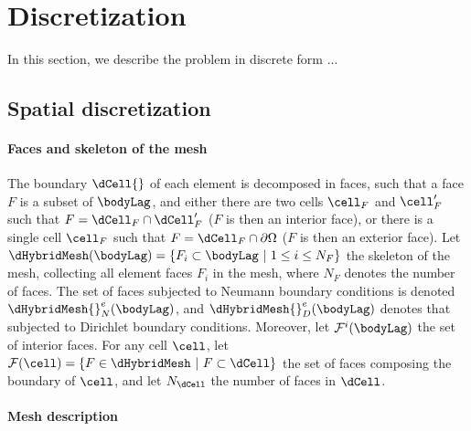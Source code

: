 %
%
\section{Discretization}
\label{sec-discretization}

In this section, we describe the problem in discrete form ...

\subsection{Spatial discretization}

\paragraph{Faces and skeleton of the mesh}

The boundary $\dCell{}$ of each element is decomposed in faces, such
that a face $F$ is a subset of $\bodyLag$, and either there are two
cells $\cell_F$ and $\cell_F'$ such that $F = \dCell_F \cap \dCell_F'$
($F$ is then an interior face), or there is a single cell $\cell_F$ such
that $F = \dCell_F \cap \partial \Omega$ ($F$ is then an exterior face).
Let $\dHybridMesh(\bodyLag) = \{ F_i \subset \bodyLag \ \vert \ 1 \leq i
\leq N_{F} \}$ the skeleton of the mesh, collecting all element faces
$F_i$ in the mesh, where $N_{F}$ denotes the number of faces. The set of
faces subjected to Neumann boundary conditions is denoted
$\dHybridMesh{}_{N}^e(\bodyLag)$, and $\dHybridMesh{}_{D}^e(\bodyLag)$
denotes that subjected to Dirichlet boundary conditions. Moreover, let
$\mathcal{F}^i(\bodyLag)$ the set of interior faces. For any cell
$\cell$, let $\mathcal{F}(\cell) = \{ F \in \dHybridMesh \ \vert \ F
\subset \dCell \}$ the set of faces composing the boundary of $\cell$,
and let $N_{\dCell}$ the number of faces in $\dCell$.

\paragraph{Mesh description}

